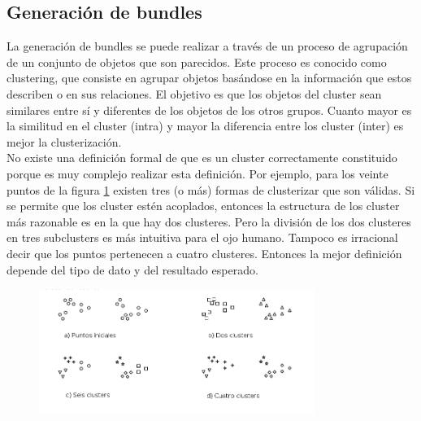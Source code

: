 \subsection{Generación de bundles}
La generación de bundles se puede realizar a través de un proceso de agrupación de un conjunto de objetos que son parecidos. Este proceso es conocido como clustering, que consiste en agrupar objetos basándose en la información que estos describen o en sus relaciones. El objetivo es que los objetos del cluster sean similares entre sí y diferentes de los objetos de los otros grupos. Cuanto mayor es la similitud en el cluster (intra) y mayor la diferencia entre los cluster (inter) es mejor la clusterización.\\
No existe una definición formal de que es un cluster correctamente constituido porque es muy complejo realizar esta definición. Por ejemplo, para los veinte puntos de la figura \ref{res:img-howToCluster} existen tres (o más) formas de clusterizar que son válidas. Si se permite que los cluster estén acoplados, entonces la estructura de los cluster más razonable es en la que hay dos clusteres. Pero la división de los dos clusteres en tres subclusters es más intuitiva para el ojo humano. Tampoco es irracional decir que los puntos pertenecen a cuatro clusteres. Entonces la mejor definición depende del tipo de dato y del resultado esperado.


\begin{figure}[H]
  \centering
   \includegraphics[width=0.8\textwidth]{img/howToCluster.png}
   \caption{}
   \label{res:img-howToCluster}
\end{figure}

